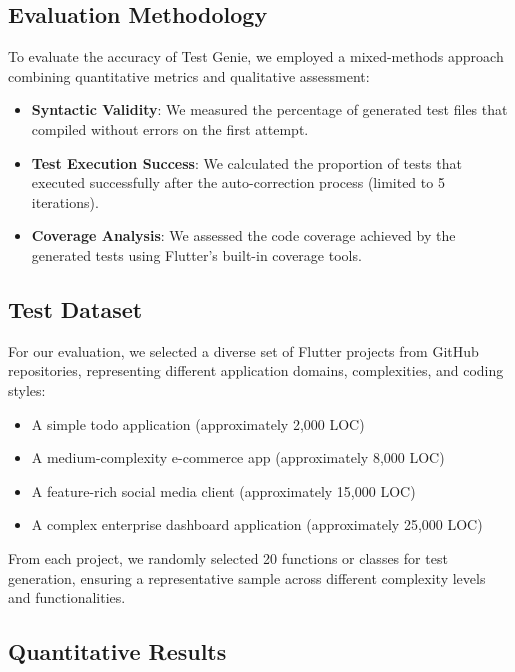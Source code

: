 \subsection{Evaluation Methodology}

To evaluate the accuracy of Test Genie, we employed a mixed-methods approach combining quantitative metrics and qualitative assessment:

\begin{itemize}
    \item \textbf{Syntactic Validity}: We measured the percentage of generated test files that compiled without errors on the first attempt.
    
    \item \textbf{Test Execution Success}: We calculated the proportion of tests that executed successfully after the auto-correction process (limited to 5 iterations).
    
    \item \textbf{Coverage Analysis}: We assessed the code coverage achieved by the generated tests using Flutter's built-in coverage tools.

\end{itemize}

\subsection{Test Dataset}

For our evaluation, we selected a diverse set of Flutter projects from GitHub repositories, representing different application domains, complexities, and coding styles:

\begin{itemize}
    \item A simple todo application (approximately 2,000 LOC)
    \item A medium-complexity e-commerce app (approximately 8,000 LOC)
    \item A feature-rich social media client (approximately 15,000 LOC)
    \item A complex enterprise dashboard application (approximately 25,000 LOC)
\end{itemize}

From each project, we randomly selected 20 functions or classes for test generation, ensuring a representative sample across different complexity levels and functionalities.

\subsection{Quantitative Results}

